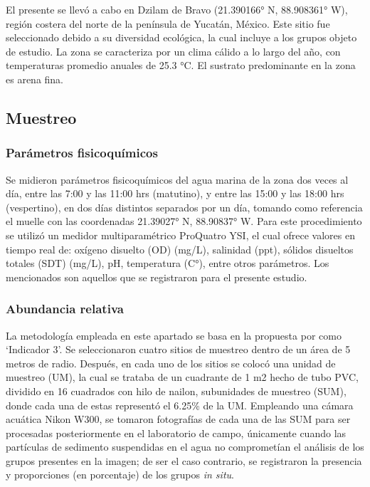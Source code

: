 \documentclass[
  authoryear,
  preprint,
  3p,
  twocolumn]{elsarticle}
\begin{document}
El presente se llevó a cabo en Dzilam de Bravo (21.390166° N, 88.908361°
W), región costera del norte de la península de Yucatán, México. Este
sitio fue seleccionado debido a su diversidad ecológica, la cual incluye
a los grupos objeto de estudio. La zona se caracteriza por un clima
cálido a lo largo del año, con temperaturas promedio anuales de 25.3 °C.
El sustrato predominante en la zona es arena fina.

\subsection{\texorpdfstring{\textbf{Muestreo}}{Muestreo}}\label{muestreo}

\subsubsection{Parámetros
fisicoquímicos}\label{paruxe1metros-fisicoquuxedmicos}

Se midieron parámetros fisicoquímicos del agua marina de la zona dos
veces al día, entre las 7:00 y las 11:00 hrs (matutino), y entre las
15:00 y las 18:00 hrs (vespertino), en dos días distintos separados por
un día, tomando como referencia el muelle con las coordenadas 21.39027°
N, 88.90837° W. Para este procedimiento se utilizó un medidor
multiparamétrico ProQuatro YSI, el cual ofrece valores en tiempo real
de: oxígeno disuelto (OD) (mg/L), salinidad (ppt), sólidos disueltos
totales (SDT) (mg/L), pH, temperatura (C°), entre otros parámetros. Los
mencionados son aquellos que se registraron para el presente estudio.

\subsubsection{Abundancia relativa}\label{abundancia-relativa}

La metodología empleada en este apartado se basa en la propuesta por
\citet{Botello2022} como `Indicador 3'. Se seleccionaron cuatro sitios
de muestreo dentro de un área de 5 metros de radio. Después, en cada uno
de los sitios se colocó una unidad de muestreo (UM), la cual se trataba
de un cuadrante de 1 m2 hecho de tubo PVC, dividido en 16 cuadrados con
hilo de nailon, subunidades de muestreo (SUM), donde cada una de estas
representó el 6.25\% de la UM. Empleando una cámara acuática Nikon W300,
se tomaron fotografías de cada una de las SUM para ser procesadas
posteriormente en el laboratorio de campo, únicamente cuando las
partículas de sedimento suspendidas en el agua no comprometían el
análisis de los grupos presentes en la imagen; de ser el caso contrario,
se registraron la presencia y proporciones (en porcentaje) de los grupos
\emph{in situ}.
\end{document}
